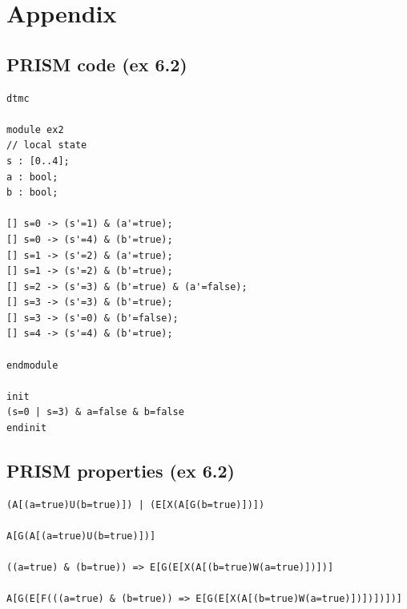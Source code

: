 \documentclass[12pt]{article}
\begin{document}
\section{Appendix}
\subsection{PRISM code (ex 6.2)}
\begin{lstlisting}[language=PRISM]
dtmc

module ex2
// local state
s : [0..4];
a : bool;
b : bool;

[] s=0 -> (s'=1) & (a'=true);
[] s=0 -> (s'=4) & (b'=true);
[] s=1 -> (s'=2) & (a'=true);
[] s=1 -> (s'=2) & (b'=true);
[] s=2 -> (s'=3) & (b'=true) & (a'=false);
[] s=3 -> (s'=3) & (b'=true);
[] s=3 -> (s'=0) & (b'=false);
[] s=4 -> (s'=4) & (b'=true);

endmodule

init
(s=0 | s=3) & a=false & b=false
endinit
\end{lstlisting}

\subsection{PRISM properties (ex 6.2)}
\begin{lstlisting}[language=PRISM]
(A[(a=true)U(b=true)]) | (E[X(A[G(b=true)])])

A[G(A[(a=true)U(b=true)])]

((a=true) & (b=true)) => E[G(E[X(A[(b=true)W(a=true)])])]

A[G(E[F(((a=true) & (b=true)) => E[G(E[X(A[(b=true)W(a=true)])])])])]

\end{lstlisting}
\end{document}

